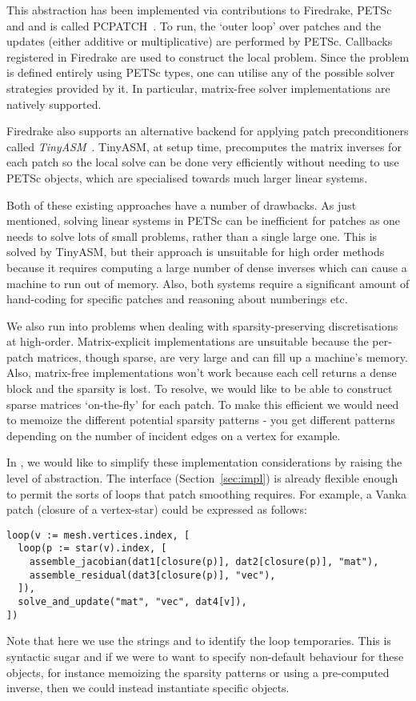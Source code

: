 This abstraction has been implemented via contributions to Firedrake, PETSc and  and is called PCPATCH~\cite{farrellPCPATCHSoftwareTopological2021}.
To run, the `outer loop' over patches and the updates (either additive or multiplicative) are performed by PETSc.
Callbacks registered in Firedrake are used to construct the local problem.
Since the problem is defined entirely using PETSc types, one can utilise any of the possible solver strategies provided by it.
In particular, matrix-free solver implementations are natively supported.

Firedrake also supports an alternative backend for applying patch preconditioners called \textit{TinyASM}~\cite{wechsungTinyASMBlockJacobiImplementation}.
TinyASM, at setup time, precomputes the matrix inverses for each patch so the local solve can be done very efficiently without needing to use PETSc objects, which are specialised towards much larger linear systems.

Both of these existing approaches have a number of drawbacks.
As just mentioned, solving linear systems in PETSc can be inefficient for patches as one needs to solve lots of small problems, rather than a single large one.
This is solved by TinyASM, but their approach is unsuitable for high order methods because it requires computing a large number of dense inverses which can cause a machine to run out of memory.
Also, both systems require a significant amount of hand-coding for specific patches and reasoning about numberings etc.

We also run into problems when dealing with sparsity-preserving discretisations at high-order.
Matrix-explicit implementations are unsuitable because the per-patch matrices, though sparse, are very large and can fill up a machine's memory.
Also, matrix-free implementations won't work because each cell returns a dense block and the sparsity is lost.
To resolve, we would like to be able to construct sparse matrices `on-the-fly' for each patch.
To make this efficient we would need to memoize the different potential sparsity patterns - you get different patterns depending on the number of incident edges on a vertex for example.

In , we would like to simplify these implementation considerations by raising the level of abstraction.
The  interface (Section~\ref{sec:impl}) is already flexible enough to permit the sorts of loops that patch smoothing requires.
For example, a Vanka patch (closure of a vertex-star) could be expressed as follows:

\begin{verbatim}
loop(v := mesh.vertices.index, [
  loop(p := star(v).index, [
    assemble_jacobian(dat1[closure(p)], dat2[closure(p)], "mat"),
    assemble_residual(dat3[closure(p)], "vec"),
  ]),
  solve_and_update("mat", "vec", dat4[v]),
])
\end{verbatim}

Note that here we use the strings  and  to identify the loop temporaries.
This is syntactic sugar and if we were to want to specify non-default behaviour for these objects, for instance memoizing the sparsity patterns or using a pre-computed inverse, then we could instead instantiate specific  objects.
